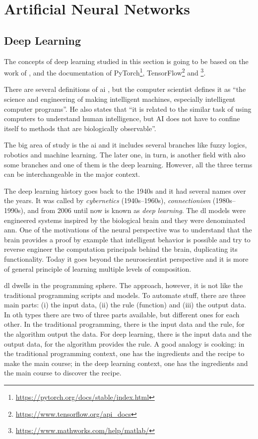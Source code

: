 \section{Artificial Neural Networks}\label{sec:ann}

\subsection{Deep Learning}\label{sec:deep_learning}

The concepts of deep learning studied in this section is going to be based on the work of \citet{goodfellow2016}, \citet{haykin1999} and the documentation of PyTorch\footnote{\url{https://pytorch.org/docs/stable/index.html}}, TensorFlow\footnote{\url{https://www.tensorflow.org/api_docs}} and \matlab\footnote{\url{https://www.mathworks.com/help/matlab/}}.

There are several definitions of \gls*{ai} \citep{winston1992}, but the  computer scientist \citet{mccarthy2007} defines it as ``the science and engineering of making intelligent machines, especially intelligent computer programs''.
He also states that ``it is related to the similar task of using computers to understand human intelligence, but AI does not have to confine itself to methods that are biologically observable''.

The big area of study is the \gls*{ai} and it includes several branches like fuzzy logics, robotics and machine learning.
The later one, in turn, is another field with also some branches and one of them is the deep learning.
However, all the three terms can be interchangeable in the major context.

The deep learning history goes back to the 1940s and it had several names over the years. 
It was called by \emph{cybernetics} (1940s--1960s), \emph{connectionism} (1980s--1990s), and from 2006 until now is known as \emph{deep learning}.
The \gls*{dl} models were engineered systems inspired by the biological brain and they were denominated \gls*{ann}.
One of the motivations of the neural  perspective was to understand that the brain provides a proof by example that intelligent behavior is possible and try to reverse engineer the computation principals behind the brain, duplicating its functionality.
Today it goes beyond the neuroscientist perspective and it is more of general principle of learning multiple levels of composition.

\gls*{dl} dwells in the programming sphere. 
The approach, however, it is not like the traditional programming scripts and models. 
To automate stuff, there are three main parts: (i) the input data, (ii) the rule (function) and (iii) the output data. 
In oth types there are two of three parts available, but different ones for each other. 
In the traditional programming, there is the input data and the rule, for the algorithm output the data. 
For deep learning, there is the input data and the output data, for the algorithm provides the rule. 
A good analogy is cooking: in the traditional programming context, one has the ingredients and the recipe to make the main course; in the deep learning context, one has the ingredients and the main course to discover the recipe.


